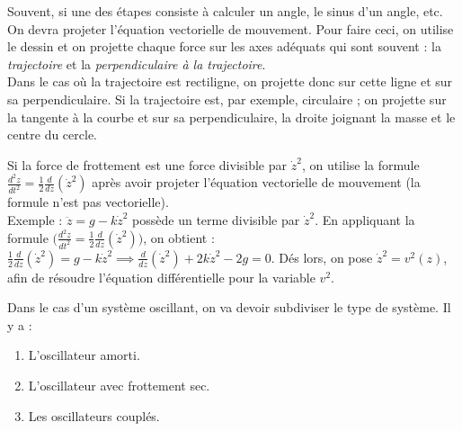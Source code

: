 \documentclass[a4paper]{article}
\begin{document}
\begin{tcolorbox}[title=\textcolor{black}{B. Calcul d'angle ou de trigonométrie}, sharp corners, colback=white, colframe=yellow]

Souvent, si une des étapes consiste à calculer un angle, le sinus d'un angle, etc. On devra projeter l'équation vectorielle de mouvement. Pour faire ceci, on utilise le dessin et on projette chaque force sur les axes adéquats qui sont souvent : la \emph{trajectoire} et la \emph{perpendiculaire à la trajectoire}. \\
Dans le cas où la trajectoire est rectiligne, on projette donc sur cette ligne et sur sa perpendiculaire. Si la trajectoire est, par exemple, circulaire ; on projette sur la tangente à la courbe et sur sa perpendiculaire, la droite joignant la masse et le centre du cercle.

\end{tcolorbox}





\begin{tcolorbox}[title=C. Présence d'un terme en $ \dot{z}^2 $ dans l'équation de mouvement, colback=white, colframe=red, sharp corners]

Si la force de frottement est une force divisible par $ \dot{z}^2 $, on utilise la formule $\displaystyle \frac{d^2 z}{d t^2} = \frac{1}{2} \frac{d}{d z} (\dot{z}^2) $ après avoir projeter l'équation vectorielle de mouvement (la formule n'est pas vectorielle). \\
Exemple : $\displaystyle \ddot{z} = g - k \dot{z}^2 $ possède un terme divisible par $ \dot{z}^2 $. En appliquant la formule $\displaystyle \Big( \frac{d^2 z}{d t^2} = \frac{1}{2} \frac{d}{d z} ( \dot{z}^2 ) \Big) $, on obtient : $\displaystyle \frac{1}{2} \frac{d}{d z} (\dot{z}^2) = g - k \dot{z}^2 \implies \frac{d}{d z} (\dot{z}^2) + 2 k \dot{z}^2 - 2 g = 0 $. Dés lors, on pose $ \dot{z}^2 = v^2(z) $, afin de résoudre l'équation différentielle pour la variable $ v^2 $.

\end{tcolorbox}





Dans le cas d'un système oscillant, on va devoir subdiviser le type de système. Il y a : 
\begin{enumerate}
\item L'oscillateur amorti.
\item L'oscillateur avec frottement sec.
\item Les oscillateurs couplés.
\end{enumerate}
\end{document}
